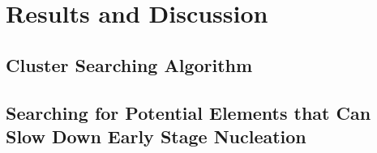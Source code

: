 \section{Results and Discussion}
\label{Chap:Al/Vac:section:RD}
\subsection{Cluster Searching Algorithm}








\subsection{Searching for Potential Elements that Can Slow Down Early Stage Nucleation}